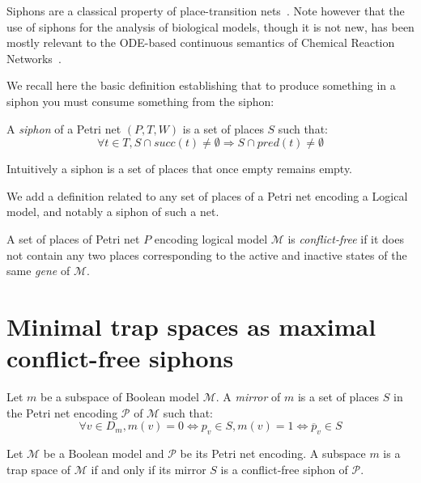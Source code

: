 \documentclass[runningheads]{llncs}
\begin{document}
Siphons are a classical property of place-transition nets~\cite{peterson1981petri}.
Note however that the use of siphons for the analysis of biological models, though it is not new, has been mostly relevant to the ODE-based continuous semantics of Chemical Reaction Networks~\cite{angeli2007petri,angeli2011persistence,degrand2020graphical}.

We recall here the basic definition establishing that to produce something in a siphon you must consume something from the siphon:

\begin{definition}

  A \emph{siphon} of a Petri net \((P, T, W)\) is a set of places \(S\) such that:
  \[\forall t\in T, S\cap succ(t)\not =\emptyset\Rightarrow S\cap pred(t)\not =\emptyset\]

\end{definition}

Intuitively a siphon is a set of places that once empty remains empty.

We add a definition related to any set of places of a Petri net encoding a Logical model, and notably a siphon of such a net.

\begin{definition}

  A set of places of Petri net \(P\) encoding logical model \(\mathcal{M}\) is \emph{conflict-free} if it does not contain any two places corresponding to the active and inactive states of the same \emph{gene} of \(\mathcal{M}\).
  
\end{definition}

\section{Minimal trap spaces as maximal conflict-free siphons}

\begin{definition}

  Let \(m\) be a subspace of Boolean model \(\mathcal{M}\). A \emph{mirror} of $m$ is a set of places $S$ in the Petri net encoding \(\mathcal{P}\) of \(\mathcal{M}\) such that:
  \[\forall v \in D_m, m(v) = 0 \Leftrightarrow p_v \in S, m(v) = 1 \Leftrightarrow \overline{p}_v \in S\]
  
\end{definition}

\begin{theorem}

  Let \(\mathcal{M}\) be a Boolean model and \(\mathcal{P}\) be its Petri net encoding. A subspace \(m\) is a trap space of \(\mathcal{M}\) if and only if its mirror \(S\) is a conflict-free siphon of \(\mathcal{P}\).
  
\end{theorem}
\end{document}
